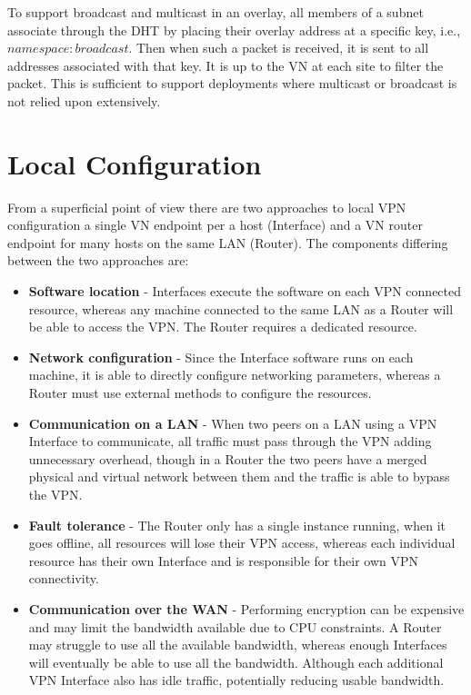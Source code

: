 To support broadcast and multicast in an overlay, all members of a subnet
associate through the DHT by placing their overlay address at a specific key,
i.e., $namespace:broadcast$.  Then when such a packet is received, it is sent
to all addresses associated with that key.  It is up to the VN at each site to
filter the packet.  This is sufficient to support deployments where multicast
or broadcast is not relied upon extensively.  

\section{Local Configuration}
From a superficial point of view there are two approaches to local VPN
configuration a single VN endpoint per a host (Interface) and a VN router
endpoint for many hosts on the same LAN (Router).  The components differing
between the two approaches are:
\begin{itemize}
\item \textbf{Software location} - Interfaces execute the software on each VPN
connected resource, whereas any machine connected to the same LAN as a Router
will be able to access the VPN.  The Router requires a dedicated resource.
\item \textbf{Network configuration} - Since the Interface software runs on
each machine, it is able to directly configure networking parameters, whereas a
Router must use external methods to configure the resources.
\item \textbf{Communication on a LAN} - When two peers on a LAN using a VPN
Interface to communicate, all traffic must pass through the VPN adding
unnecessary overhead, though in a Router the two peers have a merged physical
and virtual network between them and the traffic is able to bypass the VPN.
\item \textbf{Fault tolerance} - The Router only has a single instance running,
when it goes offline, all resources will lose their VPN access, whereas each
individual resource has their own Interface and is responsible for their own
VPN connectivity.
\item \textbf{Communication over the WAN} - Performing encryption can be
expensive and may limit the bandwidth available due to CPU constraints.  A
Router may struggle to use all the available bandwidth, whereas enough
Interfaces will eventually be able to use all the bandwidth.  Although each
additional VPN Interface also has idle traffic, potentially reducing usable
bandwidth.
\end{itemize}

